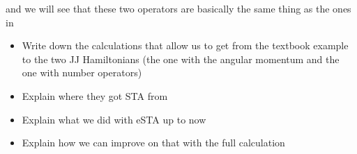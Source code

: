 and we will see that these two operators are basically the same thing as the ones in  \cite{FastGenerationJulia2012}
\newpage
\begin{itemize}
	\item Write down the calculations that allow us to get from the textbook example to the two JJ Hamiltonians (the one with the angular momentum and the one with number operators)
	\item Explain where they got STA from
	\item Explain what we did with eSTA up to now
	\item Explain how we can improve on that with the full calculation
\end{itemize}
\newpage


